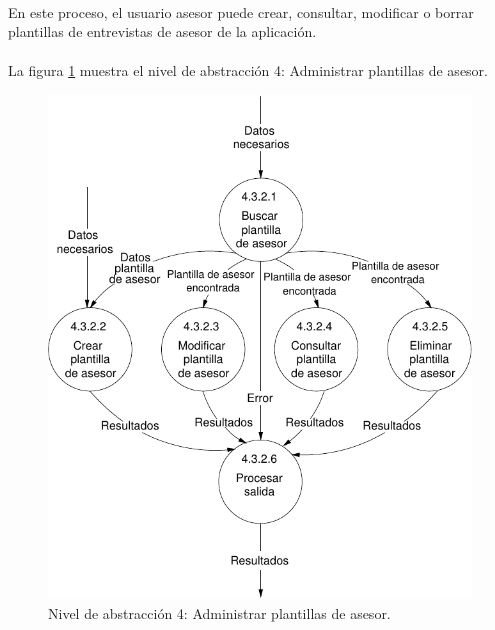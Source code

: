 \paragraph{}En este proceso, el usuario asesor puede crear, consultar, modificar
o borrar plantillas de entrevistas de asesor de la aplicación.

\paragraph{}La figura \ref{diagramaNivel4-AdministrarPlantillasAsesor}
muestra el nivel de abstracción 4: Administrar plantillas de asesor.

  \begin{figure}[!ht]
    \begin{center}
      \includegraphics[]{08.Analisis_Funcional/8.2.DFDs/Niveles/Nivel4/Asesor/AdministrarPlantillasAsesor/Diagramas/nivel4-AdministrarPlantillasAsesor.pdf}
      \caption{Nivel de abstracción 4: Administrar plantillas de asesor.}
      \label{diagramaNivel4-AdministrarPlantillasAsesor}
    \end{center}
  \end{figure}
